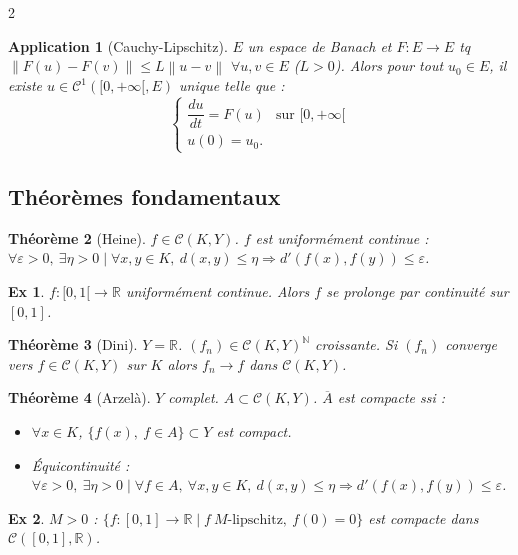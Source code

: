 \documentclass[10pt,a4paper]{article}
\theoremstyle{plan}
\newtheorem{theoreme}{Théorème}
\newtheorem{application}[theoreme]{Application}
\theoremstyle{planex}   %
\newtheorem*{exemple*}{Ex}
\newcommand{\R}{\mathbb{R}}
\newcommand{\N}{\mathbb{N}}
\newcommand{\Cc}{\mathcal{C}}
\newcommand{\norm}[1]{\left\lVert #1\right\rVert}
\begin{document}
\begin{multicols}{2}
\begin{application}[Cauchy-Lipschitz]
$E$ un espace de Banach et $F : E \to E$ tq $\norm{F(u) - F(v)} \le L \norm{u - v}$ $\forall u, v \in E$ ($L > 0$). Alors pour tout $u_0 \in E$, il existe $u \in \Cc^1([0,+\infty[, E)$ unique telle que :
\[ \begin{cases} \dfrac{du}{dt} = F(u) & \text{sur } [0,+\infty[ \\ u(0) = u_0. \end{cases} \]
\end{application}

\subsection{Théorèmes fondamentaux}

\begin{theoreme}[Heine]
$f \in \Cc(K,Y)$. $f$ est uniformément continue : $\forall \varepsilon > 0,\ \exists \eta > 0 \mid \forall x, y \in K,\ d(x,y) \le \eta \Rightarrow d'(f(x),f(y)) \le \varepsilon$.
\end{theoreme}

\begin{exemple*}
$f : [0,1[ \to \R$ uniformément continue. Alors $f$ se prolonge par continuité sur $[0,1]$.
\end{exemple*}

\begin{theoreme}[Dini]
$Y = \R$. $(f_n) \in \Cc(K,Y)^\N$ croissante. Si $(f_n)$ converge vers $f \in \Cc(K,Y)$ sur $K$ alors $f_n \to f$ dans $\Cc(K,Y)$.
\end{theoreme}

\begin{theoreme}[Arzelà]
$Y$ complet. $A \subset \Cc(K,Y)$. $\overline{A}$ est compacte ssi :
\begin{itemize}
\item $\forall x \in K$, $\{ f(x),\ f \in A \} \subset Y$ est compact.
\item Équicontinuité : $\forall \varepsilon > 0,\ \exists \eta > 0 \mid \forall f \in A,\ \forall x, y \in K,\ d(x,y) \le \eta \Rightarrow d'(f(x),f(y)) \le \varepsilon$.
\end{itemize}
\end{theoreme}

\begin{exemple*}
$M > 0$ : $\{ f : [0,1] \to \R \mid f\ M\text{-lipschitz},\ f(0) = 0 \}$ est compacte dans $\Cc([0,1],\R)$. %
\end{exemple*}


\end{multicols}
\end{document}
